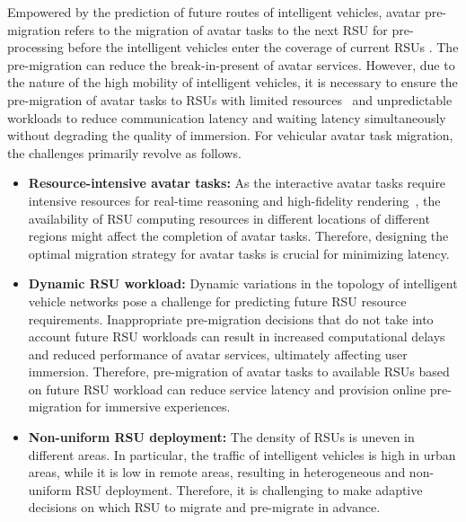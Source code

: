 \documentclass[lettersize,journal]{IEEEtran}
\begin{document}
Empowered by the prediction of future routes of intelligent vehicles, avatar pre-migration refers to the migration of avatar tasks to the next RSU for pre-processing before the intelligent vehicles enter the coverage of current RSUs \cite{sun2015green}. The pre-migration can reduce the break-in-present of avatar services. However, due to the nature of the high mobility of intelligent vehicles, it is necessary to ensure the pre-migration of avatar tasks to RSUs with limited resources~\cite{wu2023social} and unpredictable workloads to reduce communication latency and waiting latency simultaneously without degrading the quality of immersion.
For vehicular avatar task migration, the challenges primarily revolve as follows.
\begin{itemize}

\item \textbf{Resource-intensive avatar tasks:} As the interactive avatar tasks require intensive resources for real-time reasoning and high-fidelity rendering~\cite{zhang2019analysis}, the availability of RSU computing resources in different locations of different regions might affect the completion of avatar tasks. Therefore, designing the optimal migration strategy for avatar tasks is crucial for minimizing latency.

\item \textbf{Dynamic RSU workload:} Dynamic variations in the topology of intelligent vehicle networks pose a challenge for predicting future RSU resource requirements. Inappropriate pre-migration decisions that do not take into account future RSU workloads can result in increased computational delays and reduced performance of avatar services, ultimately affecting user immersion. Therefore, pre-migration of avatar tasks to available RSUs based on future RSU workload can reduce service latency and provision online pre-migration for immersive experiences.

\item \textbf{Non-uniform RSU deployment:} The density of RSUs is uneven in different areas. In particular, the traffic of intelligent vehicles is high in urban areas, while it is low in remote areas, resulting in heterogeneous and non-uniform RSU deployment. Therefore, it is challenging to make adaptive decisions on which RSU to migrate and pre-migrate in advance.



\end{itemize}
\end{document}
